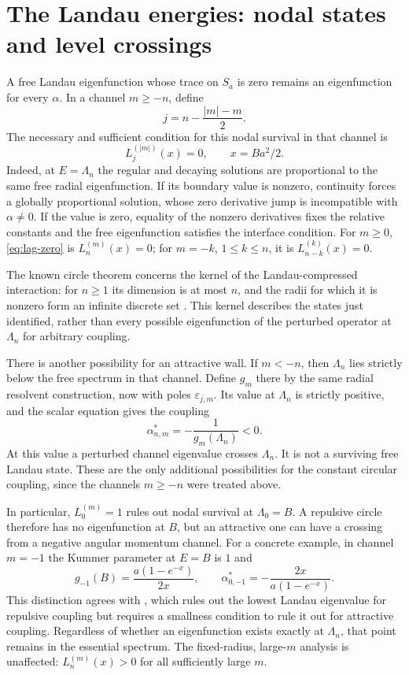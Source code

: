 \documentclass[12pt,a4paper]{article}
\numberwithin{equation}{section}
\theoremstyle{remark}
\theoremstyle{definition}
\begin{document}
\section{The Landau energies: nodal states and level crossings}
\label{sec:landaupoints}

A free Landau eigenfunction whose trace on $S_a$ is zero remains an
eigenfunction for every $\alpha$. In a channel $m\ge-n$, define
$$
j=n-\frac{|m|-m}{2}.
$$
The necessary and sufficient condition for this nodal survival in that
channel is
\begin{equation}\label{eq:lag-zero}
L_j^{(|m|)}(x)=0,\qquad x=Ba^2/2.
\end{equation}
Indeed, at $E=\Lambda_n$ the regular and decaying solutions are
proportional to the same free radial eigenfunction. If its boundary value
is nonzero, continuity forces a globally proportional solution, whose
zero derivative jump is incompatible with $\alpha\ne0$. If the value
is zero, equality of the nonzero derivatives fixes the relative constants
and the free eigenfunction satisfies the interface condition. For $m\ge0$,
\eqref{eq:lag-zero} is $L_n^{(m)}(x)=0$; for $m=-k$, $1\le k\le n$,
it is $L_{n-k}^{(k)}(x)=0$.

The known circle theorem concerns the kernel of the Landau-compressed
interaction: for $n\ge1$ its dimension is at most $n$, and the radii for
which it is nonzero form an infinite discrete set
\cite[Theorem~3.9]{BHLR2022}. This kernel describes the states just
identified, rather than every possible eigenfunction of the perturbed
operator at $\Lambda_n$ for arbitrary coupling.

There is another possibility for an attractive wall. If $m<-n$, then
$\Lambda_n$ lies strictly below the free spectrum in that channel.
Define $g_m$ there by the same radial resolvent construction, now with
poles $\varepsilon_{j,m}$. Its value at $\Lambda_n$ is strictly positive,
and the scalar equation gives the coupling
\begin{equation}\label{eq:crossing-coupling}
\alpha_{n,m}^{*}=-\frac{1}{g_m(\Lambda_n)}<0.
\end{equation}
At this value a perturbed channel eigenvalue crosses $\Lambda_n$.
It is not a surviving free Landau state. These are the only additional
possibilities for the constant circular coupling, since the channels
$m\ge-n$ were treated above.

In particular, $L_0^{(m)}=1$ rules out nodal survival at $\Lambda_0=B$.
A repulsive circle therefore has no eigenfunction at $B$, but an
attractive one can have a crossing from a negative angular momentum
channel. For a concrete example, in channel $m=-1$ the Kummer parameter
at $E=B$ is $1$ and
$$
g_{-1}(B)=\frac{a(1-e^{-x})}{2x},\qquad
\alpha_{0,-1}^{*}=-\frac{2x}{a(1-e^{-x})}.
$$
This distinction agrees with \cite[Corollary~3.7]{BHLR2022}, which rules
out the lowest Landau eigenvalue for repulsive coupling but requires a
smallness condition to rule it out for attractive coupling. Regardless of
whether an eigenfunction exists exactly at $\Lambda_n$, that point remains
in the essential spectrum. The fixed-radius, large-$m$ analysis is
unaffected: $L_n^{(m)}(x)>0$ for all sufficiently large $m$.
\end{document}
